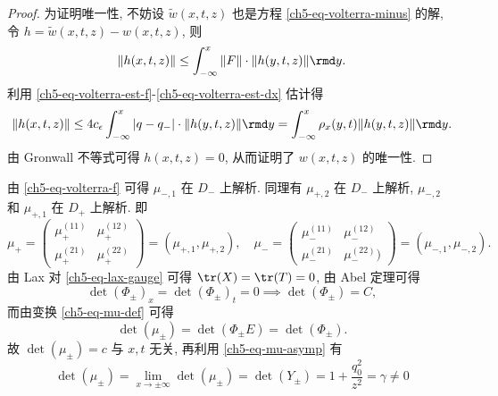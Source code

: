 \begin{proof}
    为证明唯一性, 不妨设 $ \tilde{w}(x,t,z) $ 也是方程 \eqref{ch5-eq-volterra-minus} 的解, 令 $ h = \tilde{w}(x,t,z) - w(x,t,z)$, 则
    \begin{equation}
        \|h(x,t,z)\| \leq \int_{-\infty}^{x} \| F \| \cdot \| h(y,t,z) \| \rmd y.
    \end{equation}
    利用 \eqref{ch5-eq-volterra-est-f}-\eqref{ch5-eq-volterra-est-dx} 估计得
    \begin{equation}
        \|h(x,t,z)\| \leq 4 c_{\epsilon} \int_{-\infty}^{x} |q-q_{-}| \cdot \|h(y,t,z)\| \rmd y = \int_{-\infty}^{x} \rho_{x}(y,t) \|h(y,t,z)\| \rmd y.
    \end{equation}
    由 Gronwall 不等式可得 $h(x,t,z) = 0$, 从而证明了 $w(x,t,z)$ 的唯一性.

\end{proof}
由 \eqref{ch5-eq-volterra-f} 可得 $\mu_{-,1}$ 在 $D_{-}$ 上解析. 同理有 $\mu_{+,2}$ 在 $D_{-}$ 上解析, $\mu_{-,2}$ 和 $\mu_{+,1}$ 在 $D_{+}$  上解析. 即
\begin{equation}
    \mu_{+} = \begin{pmatrix}
        \mu_{+}^{(11)} & \mu_{+}^{(12)} \\
        \mu_{+}^{(21)} & \mu_{+}^{(22)}
    \end{pmatrix} = (\mu_{+,1}, \mu_{+,2}), \quad
    \mu_{-} = \begin{pmatrix}
        \mu_{-}^{(11)} & \mu_{-}^{(12)}  \\
        \mu_{-}^{(21)} & \mu_{-}^{(22)})
    \end{pmatrix} = (\mu_{-,1}, \mu_{-,2}).
\end{equation}
由 Lax 对 \eqref{ch5-eq-lax-gauge} 可得 $\tr(X) = \tr(T) = 0$, 由 Abel 定理可得
\begin{equation}
    \det(\Phi_{\pm})_{x} = \det(\Phi_{\pm})_{t} = 0 \implies \det(\Phi_{\pm}) = C,
\end{equation}
而由变换 \eqref{ch5-eq-mu-def} 可得
\begin{equation}
    \det(\mu_{\pm}) = \det(\Phi_{\pm} E) = \det(\Phi_{\pm}).
\end{equation}
故 $ \det(\mu_{\pm}) = c $ 与 $x,t $ 无关, 再利用 \eqref{ch5-eq-mu-asymp} 有
\begin{equation}
    \det(\mu_{\pm}) = \lim_{x \to \pm \infty} \det(\mu_{\pm}) = \det(Y_{\pm}) = 1+ \frac{q_{0}^{2}}{z^{2}} = \gamma \neq 0
    \label{ch5-eq-det-mu}
\end{equation}
